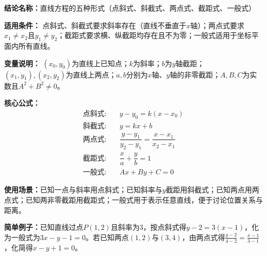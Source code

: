 \textbf{结论名称：}直线方程的五种形式（点斜式、斜截式、两点式、截距式、一般式）

\textbf{适用条件：}
点斜式、斜截式要求斜率存在（直线不垂直于\(x\)轴）；两点式要求\(x_1\neq x_2\)且\(y_1\neq y_2\)；截距式要求横、纵截距均存在且不为零；一般式适用于坐标平面内所有直线。

\textbf{变量说明：}
\((x_0,y_0)\)为直线上已知点；\(k\)为斜率；\(b\)为\(y\)轴截距；\((x_1,y_1),(x_2,y_2)\)为直线上两点；\(a,b\)分别为\(x\)轴、\(y\)轴的非零截距；\(A,B,C\)为实数且\(A^2+B^2\neq0\)。

\textbf{核心公式：}
\[
\boxed{
\begin{aligned}
\text{点斜式:}&\quad y-y_0 = k(x-x_0) \\[2pt]
\text{斜截式:}&\quad y = kx + b \\[2pt]
\text{两点式:}&\quad \dfrac{y-y_1}{y_2-y_1} = \dfrac{x-x_1}{x_2-x_1} \\[2pt]
\text{截距式:}&\quad \dfrac{x}{a} + \dfrac{y}{b} = 1 \\[2pt]
\text{一般式:}&\quad Ax + By + C = 0
\end{aligned}
}
\]

\textbf{使用场景：}已知一点与斜率用点斜式；已知斜率与\(y\)截距用斜截式；已知两点用两点式；已知两非零截距用截距式；一般式用于表示任意直线，便于讨论位置关系与距离。

\textbf{简单例子：}已知直线过点\(P(1,2)\)且斜率为\(3\)，按点斜式得\(y-2=3(x-1)\)，化为一般式为\(3x-y-1=0\)。若已知两点\((1,2)\)与\((3,4)\)，由两点式得\(\frac{y-2}{4-2}=\frac{x-1}{3-1}\)，化简得\(x-y+1=0\)。